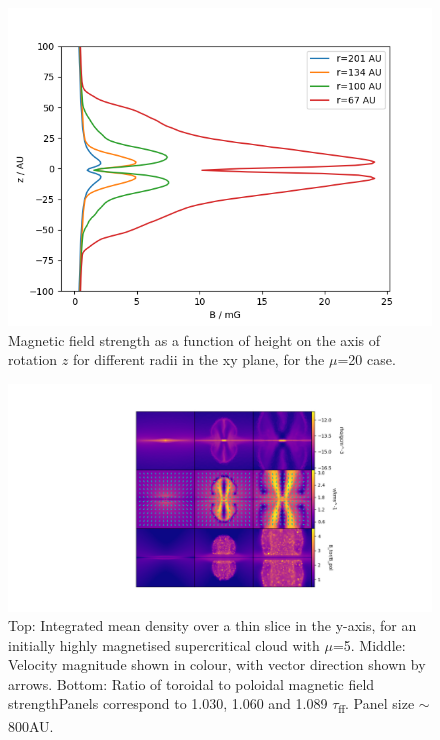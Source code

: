 \documentclass[11pt]{article}
\begin{document}
\begin{figure}[!htb]
         \centering
		\includegraphics[width=13cm]{BvsZ_mu20.png}
		\caption{Magnetic field strength as a function of height on the axis of rotation $z$ for different radii in the xy plane, for the $\mu$=20 case.}
		\label{fig:BvsZ}
\end{figure}


\begin{figure}[!htb]
         \centering
		\includegraphics[width=18cm]{burzle2.png}
		\caption{Top: Integrated mean density over a thin slice in the y-axis, for an initially highly magnetised supercritical cloud with $\mu$=5. Middle: Velocity magnitude shown in colour, with vector direction shown by arrows. Bottom: Ratio of toroidal to poloidal magnetic field strengthPanels correspond to 1.030, 1.060 and 1.089 $\tau$\textsubscript{ff}. Panel size $\sim$800AU.}
		\label{fig:burzle2}
\end{figure}
\end{document}
